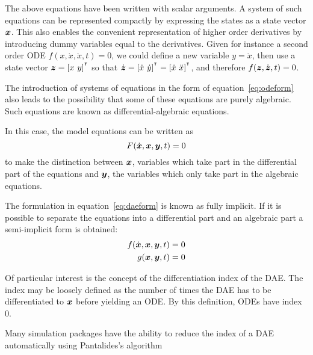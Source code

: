The above equations have been written with scalar arguments.  A system of such equations can be represented compactly by expressing the states as a state vector $\boldsymbol{x}$.  
This also enables the convenient representation of higher order derivatives by introducing dummy variables equal to the derivatives.  
Given for instance a second order ODE $f(x, \dot{x}, \ddot{x}, t)=0$, we could define a new variable $y=\dot{x}$, then use a state vector $\boldsymbol{z}=[x~y]^{{^\intercal}}$ so that $\dot{\boldsymbol{z}} = [\dot{x}~\dot{y}]^{{^\intercal}} = [\dot{x}~\ddot{x}]^{{^\intercal}}$, and therefore $f(\boldsymbol{z}, \dot{\boldsymbol{z}}, t) = 0$.  

The introduction of systems of equations in the form of equation~\ref{eq:odeform} also leads to the possibility that some of these equations are purely algebraic.
Such equations are known as differential-algebraic equations.

In this case, the model equations can be written as
\begin{equation}
  \label{eq:daeform}
  F(\dot{\boldsymbol{x}}, \boldsymbol{x}, \boldsymbol{y}, t) = 0
\end{equation}
to make the distinction between $\boldsymbol{x}$, variables which take part in the differential part of the equations and $\boldsymbol{y}$, the variables which only take part in the algebraic equations.

The formulation in equation~\ref{eq:daeform} is known as fully implicit.  
If it is possible to separate the equations into a differential part and an algebraic part a semi-implicit form is obtained:
\begin{align}
  \label{eq:daesemiimplicit}
  f(\dot{\boldsymbol{x}}, \boldsymbol{x}, \boldsymbol{y}, t) &= 0 \\
  g(\boldsymbol{x}, \boldsymbol{y}, t) &= 0
\end{align}

Of particular interest is the concept of the differentiation index of the DAE.
The index may be loosely defined as the number of times the DAE has to be differentiated to $\boldsymbol{x}$ before yielding an ODE.
By this definition, ODEs have index 0.

Many simulation packages have the ability to reduce the index of a DAE automatically using Pantalides's algorithm 

